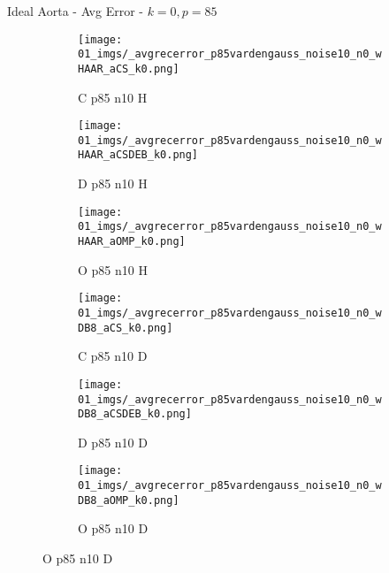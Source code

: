 \begin{frame}{Ideal Aorta - Avg Error - $k=0,p=85$}{}
\begin{figure}
\begin{subfigure}{0.13\textwidth}
\texttt{[image: 01\_imgs/\_avgrecerror\_p85vardengauss\_noise10\_n0\_wHAAR\_aCS\_k0.png]}
\caption*{\tiny C p85 n10 H}
\end{subfigure}
\begin{subfigure}{0.13\textwidth}
\texttt{[image: 01\_imgs/\_avgrecerror\_p85vardengauss\_noise10\_n0\_wHAAR\_aCSDEB\_k0.png]}
\caption*{\tiny D p85 n10 H}
\end{subfigure}
\begin{subfigure}{0.13\textwidth}
\texttt{[image: 01\_imgs/\_avgrecerror\_p85vardengauss\_noise10\_n0\_wHAAR\_aOMP\_k0.png]}
\caption*{\tiny O p85 n10 H}
\end{subfigure}
\begin{subfigure}{0.13\textwidth}
\texttt{[image: 01\_imgs/\_avgrecerror\_p85vardengauss\_noise10\_n0\_wDB8\_aCS\_k0.png]}
\caption*{\tiny C p85 n10 D}
\end{subfigure}
\begin{subfigure}{0.13\textwidth}
\texttt{[image: 01\_imgs/\_avgrecerror\_p85vardengauss\_noise10\_n0\_wDB8\_aCSDEB\_k0.png]}
\caption*{\tiny D p85 n10 D}
\end{subfigure}
\begin{subfigure}{0.13\textwidth}
\texttt{[image: 01\_imgs/\_avgrecerror\_p85vardengauss\_noise10\_n0\_wDB8\_aOMP\_k0.png]}
\caption*{\tiny O p85 n10 D}
\end{subfigure}

\vspace{5pt}


\end{figure}
\end{frame}
